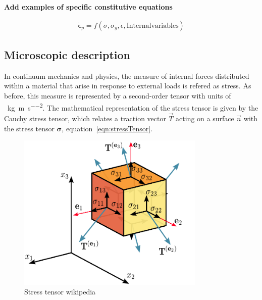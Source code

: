 \textbf{Add examples of specific constitutive equations}

\begin{gather}
    \dot{\bm{\epsilon}}_{p} = f\left(\sigma,\sigma_y,\dot{\epsilon},\mathrm{Internal variables}\right)\label{eqn:viscoplastiEQN}
\end{gather}

\subsection{Microscopic description}

In continuum mechanics and physics, the measure of internal forces distributed within a material that arise in response to external loads is refered as stress.
As before, this measure is represented by a second-order tensor with units of \SI{}{\kilo\gram\per\meter\per\second\squared}.
The mathematical representation of the stress tensor is given by the Cauchy stress tensor, which relates a traction vector $\vec{T}$ acting on a surface $\vec{n}$ with the stress tensor $\bm{\sigma}$, equation~\eqref{eqn:stressTensor}.

\begin{figure}[ht!]
    \centering
    \includegraphics[width=0.8\textwidth]{figs/Components_stress_tensor_cartesian.pdf}
    \caption{Stress tensor wikipedia}
\end{figure}

